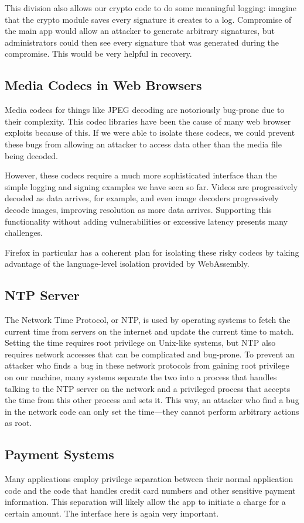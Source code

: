 This division also allows our crypto code to do some meaningful logging: imagine that the crypto module saves every signature it creates to a log. Compromise of the main app would allow an attacker to generate arbitrary signatures, but administrators could then see every signature that was generated during the compromise. This would be very helpful in recovery.

\subsection{Media Codecs in Web Browsers}
Media codecs for things like JPEG decoding are notoriously bug-prone due to their complexity. This codec libraries have been the cause of many web browser exploits because of this. If we were able to isolate these codecs, we could prevent these bugs from allowing an attacker to access data other than the media file being decoded.

However, these codecs require a much more sophisticated interface than the simple logging and signing examples we have seen so far. Videos are progressively decoded as data arrives, for example, and even image decoders progressively decode images, improving resolution as more data arrives. Supporting this functionality without adding vulnerabilities or excessive latency presents many challenges.

Firefox in particular has a coherent plan for isolating these risky codecs by taking advantage of the language-level isolation provided by WebAssembly.

\subsection{NTP Server}
The Network Time Protocol, or NTP, is used by operating systems to fetch the current time from servers on the internet and update the current time to match. Setting the time requires root privilege on Unix-like systems, but NTP also requires network accesses that can be complicated and bug-prone. To prevent an attacker who finds a bug in these network protocols from gaining root privilege on our machine, many systems separate the two into a process that handles talking to the NTP server on the network and a privileged process that accepts the time from this other process and sets it. This way, an attacker who find a bug in the network code can only set the time---they cannot perform arbitrary actions as root.

\subsection{Payment Systems}
Many applications employ privilege separation between their normal application code and the code that handles credit card numbers and other sensitive payment information. This separation will likely allow the app to initiate a charge for a certain amount. The interface here is again very important.
